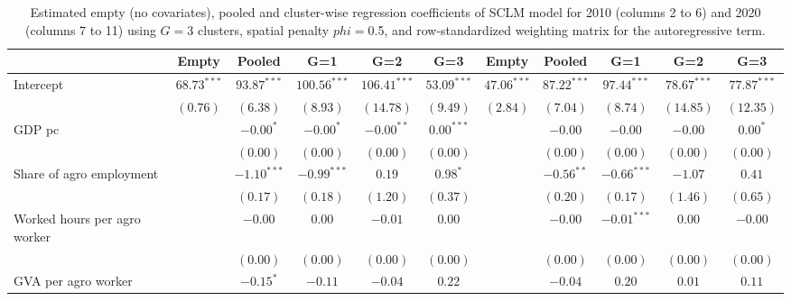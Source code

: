 
\begin{table}
\caption{Estimated empty (no covariates), pooled and cluster-wise regression coefficients of SCLM model for 2010 (columns 2 to 6) and 2020 (columns 7 to 11) using $G=$3 clusters, spatial penalty $phi=$0.5, and row-standardized weighting matrix for the autoregressive term.}
\begin{center}
\begin{tabular}{l c c c c c c c c c c}
\hline
 & Empty & Pooled & G=1 & G=2 & G=3 & Empty & Pooled & G=1 & G=2 & G=3 \\
\hline
Intercept                         & $68.73^{***}$ & $93.87^{***}$ & $100.56^{***}$ & $106.41^{***}$ & $53.09^{***}$ & $47.06^{***}$ & $87.22^{***}$ & $97.44^{***}$ & $78.67^{***}$ & $77.87^{***}$ \\
                                  & $(0.76)$      & $(6.38)$      & $(8.93)$       & $(14.78)$      & $(9.49)$      & $(2.84)$      & $(7.04)$      & $(8.74)$      & $(14.85)$     & $(12.35)$     \\
GDP pc                            &               & $-0.00^{*}$   & $-0.00^{*}$    & $-0.00^{**}$   & $0.00^{***}$  &               & $-0.00$       & $-0.00$       & $-0.00$       & $0.00^{*}$    \\
                                  &               & $(0.00)$      & $(0.00)$       & $(0.00)$       & $(0.00)$      &               & $(0.00)$      & $(0.00)$      & $(0.00)$      & $(0.00)$      \\
Share of agro employment          &               & $-1.10^{***}$ & $-0.99^{***}$  & $0.19$         & $0.98^{*}$    &               & $-0.56^{**}$  & $-0.66^{***}$ & $-1.07$       & $0.41$        \\
                                  &               & $(0.17)$      & $(0.18)$       & $(1.20)$       & $(0.37)$      &               & $(0.20)$      & $(0.17)$      & $(1.46)$      & $(0.65)$      \\
Worked hours per agro worker      &               & $-0.00$       & $0.00$         & $-0.01$        & $0.00$        &               & $-0.00$       & $-0.01^{***}$ & $0.00$        & $-0.00$       \\
                                  &               & $(0.00)$      & $(0.00)$       & $(0.00)$       & $(0.00)$      &               & $(0.00)$      & $(0.00)$      & $(0.00)$      & $(0.00)$      \\
GVA per agro worker               &               & $-0.15^{*}$   & $-0.11$        & $-0.04$        & $0.22$        &               & $-0.04$       & $0.20$        & $0.01$        & $0.11$        \\

\end{tabular}
\end{center}
\end{table}
